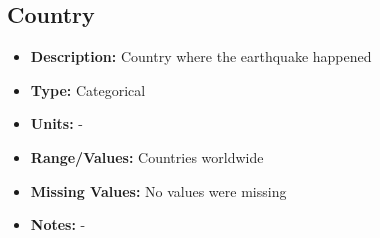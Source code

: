 \documentclass[a4paper]{article}
\begin{document}

\subsection{Country}
\begin{itemize}
    \item \textbf{Description:} Country where the earthquake happened
    \item \textbf{Type:} Categorical
    \item \textbf{Units:} -
    \item \textbf{Range/Values:} Countries worldwide
    \item \textbf{Missing Values:} No values were missing
    \item \textbf{Notes:} -
\end{itemize}

\end{document}
